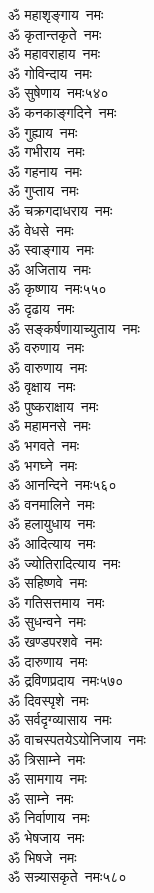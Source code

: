 \begin{multicols}{2}
\begin{flushleft}
ॐ महाशृङ्गाय~नमः\\
ॐ कृतान्तकृते~नमः\\
ॐ महावराहाय~नमः\\
ॐ गोविन्दाय~नमः\\
ॐ सुषेणाय~नमः\hfill ५४०\\
ॐ कनकाङ्गदिने~नमः\\
ॐ गुह्याय~नमः\\
ॐ गभीराय~नमः\\
ॐ गहनाय~नमः\\
ॐ गुप्ताय~नमः\\
ॐ चक्रगदाधराय~नमः\\
ॐ वेधसे~नमः\\
ॐ स्वाङ्गाय~नमः\\
ॐ अजिताय~नमः\\
ॐ कृष्णाय~नमः\hfill ५५०\\
ॐ दृढाय~नमः\\
ॐ सङ्कर्षणायाच्युताय~नमः\\
ॐ वरुणाय~नमः\\
ॐ वारुणाय~नमः\\
ॐ वृक्षाय~नमः\\
ॐ पुष्कराक्षाय~नमः\\
ॐ महामनसे~नमः\\
ॐ भगवते~नमः\\
ॐ भगघ्ने~नमः\\
ॐ आनन्दिने~नमः\hfill ५६०\\
ॐ वनमालिने~नमः\\
ॐ हलायुधाय~नमः\\
ॐ आदित्याय~नमः\\
ॐ ज्योतिरादित्याय~नमः\\
ॐ सहिष्णवे~नमः\\
ॐ गतिसत्तमाय~नमः\\
ॐ सुधन्वने~नमः\\
ॐ खण्डपरशवे~नमः\\
ॐ दारुणाय~नमः\\
ॐ द्रविणप्रदाय~नमः\hfill ५७०\\
ॐ दिवस्पृशे~नमः\\
ॐ सर्वदृग्व्यासाय~नमः\\
ॐ वाचस्पतयेऽयोनिजाय~नमः\\
ॐ त्रिसाम्ने~नमः\\
ॐ सामगाय~नमः\\
ॐ साम्ने~नमः\\
ॐ निर्वाणाय~नमः\\
ॐ भेषजाय~नमः\\
ॐ भिषजे~नमः\\
ॐ सन्न्यासकृते~नमः\hfill ५८०\\

\end{flushleft}
\end{multicols}
